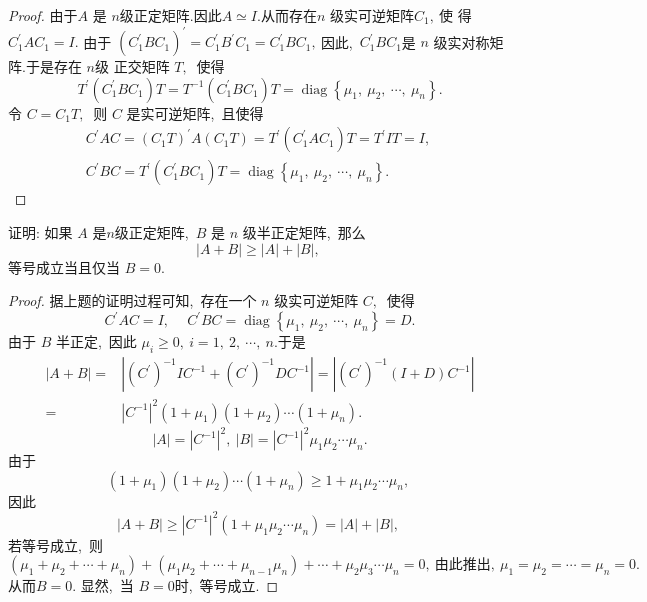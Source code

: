 \begin{proof}
	由于$  A$  是  $n $级正定矩阵.因此$  A \simeq I  .$从而存在$  n $ 级实可逆矩阵$  C_{1} ,\  $使 得  $C_{1}^{\prime} A C_{1}=I  .$
	由于  $\left(C_{1}^{\prime} B C_{1}\right)^{\prime}=C_{1}^{\prime} B^{\prime} C_{1}=C_{1}^{\prime} B C_{1} ,\  $因此,\  $ C_{1}^{\prime} B C_{1}  $是  $n $ 级实对称矩阵.于是存在  $n  $级 正交矩阵 $ T ,\ $ 使得
	$$T^{\prime}\left(C_{1}^{\prime} B C_{1}\right) T=T^{-1}\left(C_{1}^{\prime} B C_{1}\right) T=\operatorname{diag}\left\{\mu_{1},\  \mu_{2},\  \cdots,\  \mu_{n}\right\} .$$
	令 $ C=C_{1} T ,\ $ 则  $C $ 是实可逆矩阵,\  且使得
	$$\begin{array}{l}
		C^{\prime} A C=\left(C_{1} T\right)^{\prime} A\left(C_{1} T\right)=T^{\prime}\left(C_{1}^{\prime} A C_{1}\right) T=T^{\prime} I T=I,\  \\
		C^{\prime} B C=T^{\prime}\left(C_{1}^{\prime} B C_{1}\right) T=\operatorname{diag}\left\{\mu_{1},\  \mu_{2},\  \cdots,\  \mu_{n}\right\} .
	\end{array}$$
\end{proof}
\newpage
\begin{problem}
	证明: 如果 $ A $ 是$  n  $级正定矩阵,\  $ B $ 是 $ n$  级半正定矩阵,\  那么
	$$|A+B| \geqslant|A|+|B|,\ $$
	等号成立当且仅当 $ B=0  .$
\end{problem}
\begin{proof}
	据上题的证明过程可知,\  存在一个  $n$  级实可逆矩阵 $ C ,\ $ 使得
	$$C^{\prime} A C=I,\  \quad C^{\prime} B C=\operatorname{diag}\left\{\mu_{1},\  \mu_{2},\  \cdots,\  \mu_{n}\right\}=D .$$
	由于 $ B $ 半正定,\  因此  $\mu_{i} \geqslant 0,\  i=1,\ 2,\  \cdots,\ n  .$于是
	$$\begin{aligned}
		|A+B|= & \left|\left(C^{\prime}\right)^{-1} I C^{-1}+\left(C^{\prime}\right)^{-1} D C^{-1}\right|=\left|\left(C^{\prime}\right)^{-1}(I+D) C^{-1}\right| \\
		= & \left|C^{-1}\right|^{2}\left(1+\mu_{1}\right)\left(1+\mu_{2}\right) \cdots\left(1+\mu_{n}\right) . 
	\end{aligned}$$
	$$|A|=\left|C^{-1}\right|^{2},\ |B|=\left|C^{-1}\right|^{2} \mu_{1} \mu_{2} \cdots \mu_{n} . $$
	由于
	$$\left(1+\mu_{1}\right)\left(1+\mu_{2}\right) \cdots\left(1+\mu_{n}\right) \geqslant 1+\mu_{1} \mu_{2} \cdots \mu_{n},\  $$
	因此
	$$|A+B| \geqslant\left|C^{-1}\right|^{2}\left(1+\mu_{1} \mu_{2} \cdots \mu_{n}\right)=|A|+|B|,\ $$
	若等号成立,\  则  $\left(\mu_{1}+\mu_{2}+\cdots+\mu_{n}\right)+\left(\mu_{1} \mu_{2}+\cdots+\mu_{n-1} \mu_{n}\right)+\cdots+\mu_{2} \mu_{3} \cdots \mu_{n}=0 ,\  由此推出,\   \mu_{1}=\mu_{2}=\cdots=\mu_{n}=0  .$从而$  B=0  .$
	显然,\  当 $ B=0  $时,\  等号成立.
\end{proof}
